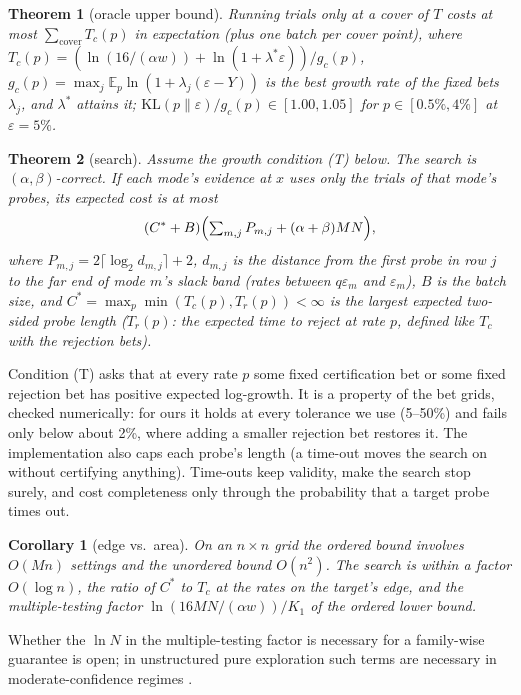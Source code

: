 \documentclass{article}
\newtheorem{theorem}{Theorem}
\newtheorem{corollary}{Corollary}
\newcommand{\eps}{\varepsilon}
\newcommand{\KL}{\mathrm{KL}}
\newcommand{\E}{\mathbb{E}}
\begin{document}
\begin{theorem}[oracle upper bound]\label{thm:oracle}
Running trials only at a cover of $T$ costs at most
$\sum_{\text{cover}}T_c(p)$ in expectation (plus one batch per cover
point), where $T_c(p)=(\ln(16/(\alpha w))+\ln(1+\lambda^*\eps))/g_c(p)$,
$g_c(p)=\max_j\E_p\ln(1+\lambda_j(\eps-Y))$ is the best growth rate of
the fixed bets $\lambda_j$, and $\lambda^*$ attains it;
$\KL(p\|\eps)/g_c(p)\in[1.00,1.05]$ for $p\in[0.5\%,4\%]$ at
$\eps=5\%$.
\end{theorem}

\begin{theorem}[search]\label{thm:search}
Assume the growth condition (T) below. The search is
$(\alpha,\beta)$-correct. If each mode's evidence at $x$ uses
only the trials of that mode's probes, its expected cost is at most
\[
(C^*+B)\Bigl(\textstyle\sum_{m,j}P_{m,j}+(\alpha+\beta)MN\Bigr),
\]
where $P_{m,j}=2\lceil\log_2 d_{m,j}\rceil+2$, $d_{m,j}$ is the distance
from the first probe in row $j$ to the far end of mode $m$'s slack band
(rates between $q\eps_m$ and $\eps_m$), $B$ is the batch size, and
$C^*=\max_p\min(T_c(p),T_r(p))<\infty$ is the largest expected
two-sided probe length ($T_r(p)$: the expected time to reject at rate $p$,
defined like $T_c$ with the rejection bets).
\end{theorem}
Condition (T) asks that at every rate $p$ some fixed certification bet or
some fixed rejection bet has positive expected log-growth. It is a
property of the bet grids, checked numerically: for ours it holds at every
tolerance we use (5--50\%) and fails only below about 2\%, where adding a
smaller rejection bet restores it. The implementation also caps each
probe's length (a time-out moves the search on without certifying
anything). Time-outs keep validity, make the search stop surely, and cost
completeness only through the probability that a target probe times out.

\begin{corollary}[edge vs.\ area]
On an $n\times n$ grid the ordered bound involves $O(Mn)$ settings and
the unordered bound $O(n^2)$. The search is within a factor $O(\log n)$,
the ratio of $C^*$ to $T_c$ at the rates on the target's edge, and the
multiple-testing factor
$\ln(16MN/(\alpha w))/K_1$ of the ordered lower bound.
\end{corollary}
Whether the $\ln N$ in the multiple-testing factor is necessary for a
family-wise guarantee is open; in unstructured pure exploration such terms
are necessary in moderate-confidence regimes \citep{simchowitz2017simulator}.
\end{document}
